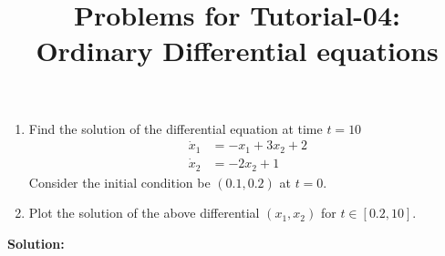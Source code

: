 \documentclass[10pt,a4paper]{article}
\begin{document}
\title{Problems for Tutorial-04: \\Ordinary Differential equations}
\date{}
\maketitle
\begin{enumerate}
\item Find the solution of the differential equation at time $t = 10$ 
\begin{align*}
	\dot{x}_1 &= -x_1 + 3 x_2 + 2\\
	\dot{x}_2 &= -2 x_2 + 1
\end{align*}
Consider the initial condition be $(0.1,0.2)$ at $t = 0$. 
\item Plot the solution of the above differential $(x_1,x_2)$ for $t \in [0.2,10]$.
\end{enumerate}
{\bf Solution:}
\begin{figure}[ht!]
\end{figure}
\end{document}
